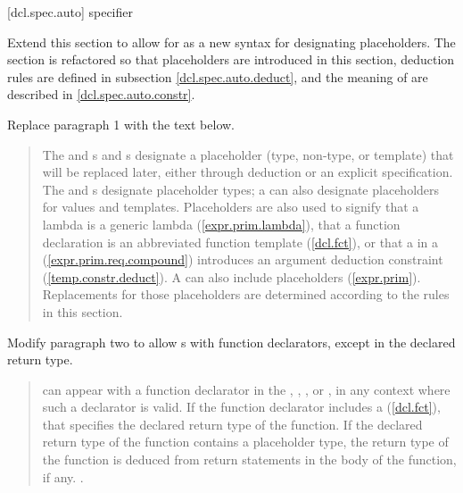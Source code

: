 \setcounter{subsubsection}{3}
[dcl.spec.auto]{ specifier}

Extend this section to allow for 
as a new syntax for designating placeholders. The section is refactored so
that placeholders are introduced in this section, deduction rules are
defined in subsection \ref{dcl.spec.auto.deduct}, and the meaning of
 are described in
\ref{dcl.spec.auto.constr}.

Replace paragraph 1 with the text below.

\begin{quote}
\pnum
The  and  s and
s designate a placeholder
(type, non-type, or template) that will be replaced later, either through 
deduction or an explicit specification.
%
The  and  s 
designate placeholder types; a  can 
also designate placeholders for values and templates. 
%
Placeholders are also used to signify that a lambda is a generic lambda 
(\ref{expr.prim.lambda}), that a function declaration is an
abbreviated function template (\ref{dcl.fct}), or that a 
 in a 
(\ref{expr.prim.req.compound}) introduces an argument deduction constraint 
(\ref{temp.constr.deduct}).
%
\enternote
A  can also include placeholders (\ref{expr.prim}).
Replacements for those placeholders are determined according to the rules
in this section.
\exitnote
% 
\end{quote}

Modify paragraph two to allow s
with function declarators, except in the declared return type.

\begin{quote}
\pnum
{} can appear with a function 
declarator in the , ,
, or , 
in any context where such a declarator is valid. 
% 
If the function declarator includes a  
(\ref{dcl.fct}), that specifies the declared return type of the function.
% 
If the declared return type of the function contains a placeholder type, the 
return type of the function is deduced from return statements in the body of 
the function, if any.
%
.
%
\end{quote}

